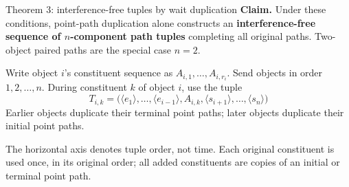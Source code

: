 \begin{frame}{Theorem 3: interference-free tuples by wait duplication}
\small
\textbf{Claim.} Under these conditions, point-path duplication alone constructs
an \textbf{interference-free sequence of $n$-component path tuples} completing all original paths.
Two-object paired paths are the special case $n=2$.
\par\medskip
Write object $i$'s constituent sequence as $A_{i,1},\ldots,A_{i,r_i}$.
Send objects in order $1,2,\ldots,n$. During constituent $k$ of object $i$, use the tuple
\begin{equation}
 T_{i,k}=\bigl(
 \langle e_1\rangle,\ldots,\langle e_{i-1}\rangle,
 A_{i,k},
 \langle s_{i+1}\rangle,\ldots,\langle s_n\rangle
 \bigr)
 \tag{33}
\end{equation}
Earlier objects duplicate their terminal point paths; later objects duplicate their initial point paths.
\begin{center}\end{center}
\footnotesize The horizontal axis denotes tuple order, not time. Each original constituent is used once,
in its original order; all added constituents are copies of an initial or terminal point path.
\end{frame}

